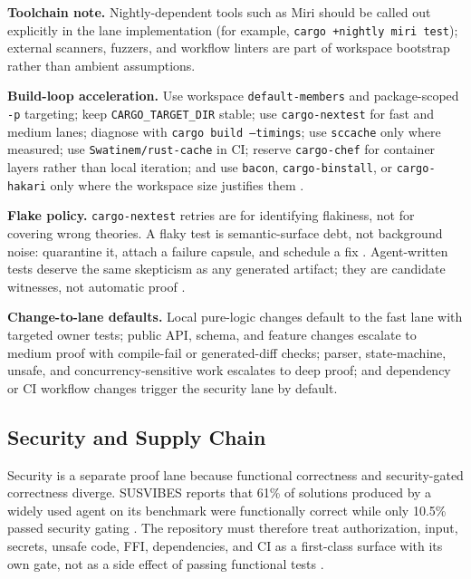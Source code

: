 \documentclass[conference]{IEEEtran}
\begin{document}
\noindent\textbf{Toolchain note.} Nightly-dependent tools such as Miri should be called out explicitly in the lane implementation (for example, \texttt{cargo +nightly miri test}); external scanners, fuzzers, and workflow linters are part of workspace bootstrap rather than ambient assumptions.

\noindent\textbf{Build-loop acceleration.} Use workspace \texttt{default-members} and package-scoped \texttt{-p} targeting; keep \texttt{CARGO\_TARGET\_DIR} stable; use \texttt{cargo-nextest} for fast and medium lanes; diagnose with \texttt{cargo build --timings}; use \texttt{sccache} only where measured; use \texttt{Swatinem/rust-cache} in CI; reserve \texttt{cargo-chef} for container layers rather than local iteration; and use \texttt{bacon}, \texttt{cargo-binstall}, or \texttt{cargo-hakari} only where the workspace size justifies them \cite{cargoBuildCache2026,cargoTimings2026,sccache2026,cargoChef2026,bacon2026,nextest2026}.

\noindent\textbf{Flake policy.} \texttt{cargo-nextest} retries are for identifying flakiness, not for covering wrong theories. A flaky test is semantic-surface debt, not background noise: quarantine it, attach a failure capsule, and schedule a fix \cite{nextest2026}. Agent-written tests deserve the same skepticism as any generated artifact; they are candidate witnesses, not automatic proof \cite{rethinkingAgentTests2026,tdad2026}.

\noindent\textbf{Change-to-lane defaults.} Local pure-logic changes default to the fast lane with targeted owner tests; public API, schema, and feature changes escalate to medium proof with compile-fail or generated-diff checks; parser, state-machine, unsafe, and concurrency-sensitive work escalates to deep proof; and dependency or CI workflow changes trigger the security lane by default.

\subsection{Security and Supply Chain}
\label{sec:security}
Security is a separate proof lane because functional correctness and security-gated correctness diverge. SUSVIBES reports that 61\% of solutions produced by a widely used agent on its benchmark were functionally correct while only 10.5\% passed security gating \cite{susvibes2025}. The repository must therefore treat authorization, input, secrets, unsafe code, FFI, dependencies, and CI as a first-class surface with its own gate, not as a side effect of passing functional tests \cite{owaspLlmTop102026,owaspAgentSecurity2026,nistSsdf2022,openssfScorecard2026}.
\end{document}
